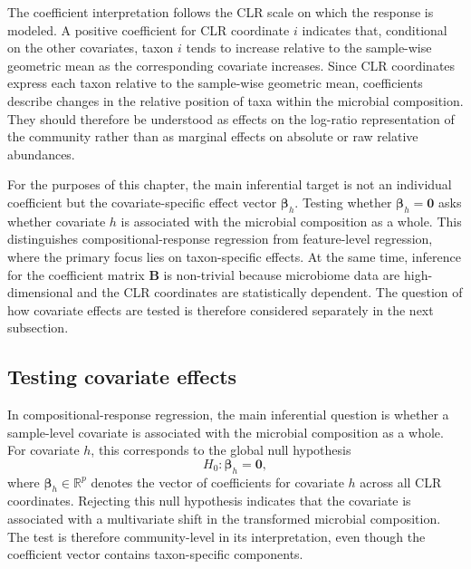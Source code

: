 The coefficient interpretation follows the CLR scale on which the response is modeled. A positive coefficient for CLR coordinate $i$ indicates that, conditional on the other covariates, taxon $i$ tends to increase relative to the sample-wise geometric mean as the corresponding covariate increases. Since CLR coordinates express each taxon relative to the sample-wise geometric mean, coefficients describe changes in the relative position of taxa within the microbial composition. They should therefore be understood as effects on the log-ratio representation of the community rather than as marginal effects on absolute or raw relative abundances. 

For the purposes of this chapter, the main inferential target is not an individual coefficient but the covariate-specific effect vector $\boldsymbol{\beta}_h$. Testing whether $\boldsymbol{\beta}_h=\mathbf{0}$ asks whether covariate $h$ is associated with the microbial composition as a whole. This distinguishes compositional-response regression from feature-level regression, where the primary focus lies on taxon-specific effects. At the same time, inference for the coefficient matrix $\mathbf{B}$ is non-trivial because microbiome data are high-dimensional and the CLR coordinates are statistically dependent. The question of how covariate effects are tested is therefore considered separately in the next subsection.

\subsection{Testing covariate effects}
\label{sec:3community:regression:testing}

In compositional-response regression, the main inferential question is whether a sample-level covariate is associated with the microbial composition as a whole. For covariate $h$, this corresponds to the global null hypothesis
\begin{equation}
H_0:\boldsymbol{\beta}_h=\mathbf{0},
\end{equation}
where $\boldsymbol{\beta}_h\in\mathbb{R}^p$ denotes the vector of coefficients for covariate $h$ across all CLR coordinates. Rejecting this null hypothesis indicates that the covariate is associated with a multivariate shift in the transformed microbial composition. The test is therefore community-level in its interpretation, even though the coefficient vector contains taxon-specific components.

